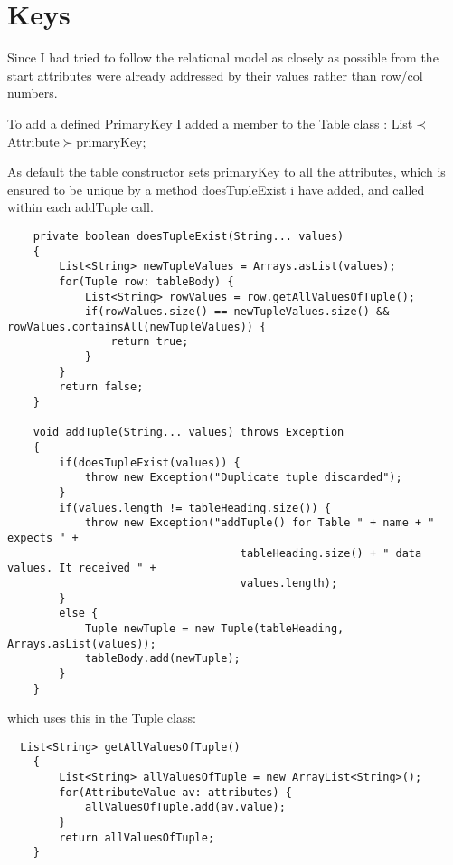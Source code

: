 \documentclass[11pt]{article} %
\begin{document}
\section{Keys}

Since I had tried to follow the relational model as closely as possible from the start attributes were already addressed by their values rather than row/col numbers. 

To add a defined PrimaryKey I added a member to the Table class :    List$\prec$ Attribute$ \succ $primaryKey;

As default the table constructor sets primaryKey to all the attributes, which is ensured to be unique by a method doesTupleExist i have added, and called within each addTuple call.

\begin{lstlisting}
    private boolean doesTupleExist(String... values)
    {
        List<String> newTupleValues = Arrays.asList(values);
        for(Tuple row: tableBody) {
            List<String> rowValues = row.getAllValuesOfTuple();
            if(rowValues.size() == newTupleValues.size() && rowValues.containsAll(newTupleValues)) {
                return true;
            }
        }
        return false;
    }
    
    void addTuple(String... values) throws Exception
    {
        if(doesTupleExist(values)) {
            throw new Exception("Duplicate tuple discarded");
        }
        if(values.length != tableHeading.size()) {
            throw new Exception("addTuple() for Table " + name + " expects " +
                                    tableHeading.size() + " data values. It received " +
                                    values.length);
        }
        else {
            Tuple newTuple = new Tuple(tableHeading, Arrays.asList(values));
            tableBody.add(newTuple);
        }
    }
\end{lstlisting}

which uses this in the Tuple class:

\begin{lstlisting}
  List<String> getAllValuesOfTuple()
    {
        List<String> allValuesOfTuple = new ArrayList<String>();
        for(AttributeValue av: attributes) {
            allValuesOfTuple.add(av.value);
        }
        return allValuesOfTuple;
    }
    
\end{lstlisting}
  
\end{document}
